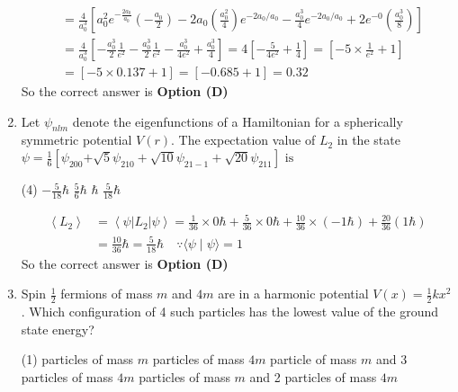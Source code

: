 \begin{enumerate}
\begin{answer}
$$\begin{aligned}
&=\frac{4}{a_{0}^{3}}\left[a_{0}^{2} e^{-\frac{2 a_{0}}{a_{0}}}\left(-\frac{a_{0}}{2}\right)-2 a_{0}\left(\frac{a_{0}^{2}}{4}\right) e^{-2 a_{0} / a_{0}}-\frac{a_{0}^{3}}{4} e^{-2 a_{0} / a_{0}}+2 e^{-0}\left(\frac{a_{0}^{3}}{8}\right)\right]\\
&=\frac{4}{a_{0}^{3}}\left[-\frac{a_{0}^{3}}{2} \frac{1}{e^{2}}-\frac{a_{0}^{3}}{2} \frac{1}{e^{2}}-\frac{a_{0}^{3}}{4 e^{2}}+\frac{a_{0}^{3}}{4}\right]=4\left[-\frac{5}{4 e^{2}}+\frac{1}{4}\right]=\left[-5 \times \frac{1}{e^{2}}+1\right]\\
&=[-5 \times 0.137+1]=[-0.685+1]=0.32
\end{aligned}
$$
So the correct answer is \textbf{Option (D)}
\end{answer}
	\item Let $\psi_{n l m}$ denote the eigenfunctions of a Hamiltonian for a spherically symmetric potential $V(r)$. The expectation value of $L_{2}$ in the state\\
	$\psi=\frac{1}{6}\left[\psi_{200}\right. $$\left. +\sqrt{5} \psi_{210}+\sqrt{10} \psi_{21-1}+\sqrt{20} \psi_{211}\right] \text { is }$
{	}
\begin{tasks}(4)
\task[\textbf{A.}] $-\frac{5}{18} \hbar$
\task[\textbf{B.}] $\frac{5}{6} \hbar$
\task[\textbf{C.}] $\hbar$
\task[\textbf{D.}] $\frac{5}{18} \hbar$
\end{tasks}
\begin{answer}
	$$
\begin{aligned}
\left\langle L_{2}\right\rangle&=\left\langle\psi\left|L_{2}\right| \psi\right\rangle=\frac{1}{36} \times 0 \hbar+\frac{5}{36} \times 0 \hbar+\frac{10}{36} \times(-1 \hbar)+\frac{20}{36}(1 \hbar)\\&=\frac{10}{36} \hbar=\frac{5}{18} \hbar \quad \because\langle\psi \mid \psi\rangle=1
\end{aligned}
$$
So the correct answer is \textbf{Option (D)}
\end{answer}
	\item Spin $\frac{1}{2}$ fermions of mass $m$ and $4 m$ are in a harmonic potential $V(x)=\frac{1}{2} k x^{2}$. Which configuration of 4 such particles has the lowest value of the ground state energy?
{	}
\begin{tasks}(1)
 particles of mass $m$
 particles of mass $4 m$
 particle of mass $m$ and 3 particles of mass $4 m$
 particles of mass $m$ and 2 particles of mass $4 m$
\end{tasks}
$$
\end{enumerate}
